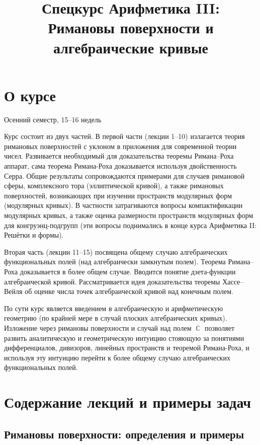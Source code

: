 \documentclass[a4paper, 12pt]{article}
\title{Спецкурс Арифметика III:\\ Римановы поверхности и алгебраические кривые}
\date{}
\DeclareMathOperator{\CC}{\mathbb{C}}
\begin{document}
\maketitle

\tableofcontents

\section{О курсе}

Осенний семестр, 15--16 недель

Курс состоит из двух частей. В первой части (лекции 1--10) излагается теория римановых поверхностей с уклоном в приложения для современной теории чисел. Развивается необходимый для доказательства теоремы Римана--Роха аппарат, сама теорема Римана-Роха доказывается используя двойственность Серра. Общие результаты сопровождаются примерами для случаев римановой сферы, комплексного тора (эллиптической кривой), а также римановых поверхностей, возникающих при изучении пространств модулярных форм (модулярных кривых). В частности затрагиваются вопросы компактификации модулярных кривых, а также оценка размерности пространств модулярных форм для конгруэнц-подгрупп (эти вопросы поднимались в конце курса Арифметика II: Решётки и формы).

Вторая часть (лекции 11--15) посвящена общему случаю алгебраических функциональных полей (над алгебраически замкнутым полем). Теорема Римана--Роха доказывается в более общем случае. Вводится понятие дзета-функции алгебраической кривой. Рассматривается идея доказательства теоремы Хассе--Вейля об оценке числа точек алгебраической кривой над конечным полем.

По сути курс является введением в алгебраическую и арифметическую геометрию (по крайней мере в случай плоских алгебраических кривых). Изложение через римановы поверхности и случай над полем $\CC$ позволяет развить аналитическую и геометрическую интуицию стояющую за понятиями дифференциалов, дивизоров, линейных пространств и теоремой Римана-Роха, и используя эту интуицию перейти к более общему случаю алгебраических функциональных полей.

\section{Содержание лекций и примеры задач}

\subsection{Римановы поверхности: определения и примеры}
\end{document}
